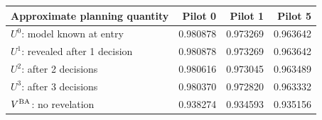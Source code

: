 \begin{tabular}{lrrr}\toprule
Approximate planning quantity & Pilot 0 & Pilot 1 & Pilot 5\\\midrule
$U^0$: model known at entry & 0.980878 & 0.973269 & 0.963642\\
$U^1$: revealed after 1 decision & 0.980878 & 0.973269 & 0.963642\\
$U^2$: after 2 decisions & 0.980616 & 0.973045 & 0.963489\\
$U^3$: after 3 decisions & 0.980370 & 0.972820 & 0.963332\\
$V^{\rm BA}$: no revelation & 0.938274 & 0.934593 & 0.935156\\
\bottomrule\end{tabular}
